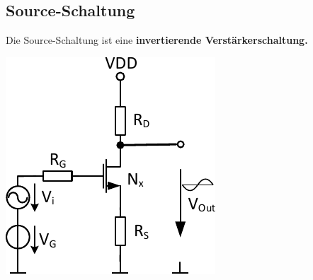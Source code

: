 \subsection{Source-Schaltung}
\label{Source-Schaltung}

Die Source-Schaltung ist eine \textbf{invertierende Verstärkerschaltung.}

\smallskip

\begin{minipage}[t]{0.4\columnwidth}
    \includegraphics[width=\columnwidth, align=t]{images/03_source_schaltung.pdf}
\end{minipage}
\hfill
